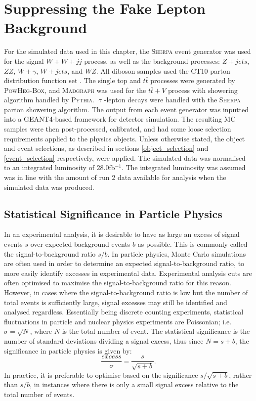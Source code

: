 \chapter{Suppressing the Fake Lepton Background}
For the simulated data used in this chapter, the \textsc{Sherpa} event generator was used for the signal $W+W+jj$ process, as well as the background processes: $Z+jets$, $ZZ$, $W+\gamma$, $W+jets$, and $WZ$. All diboson samples used the CT10 parton distribution function set \cite{CT10}. The single top and $t\bar{t}$ processes were generated by \textsc{PowHeg-Box}, and \textsc{Madgraph} was used for the $t\bar{t}+V$ process with showering algorithm handled by \textsc{Pythia}. $\uptau$-lepton decays were handled with the \textsc{Sherpa} parton showering algorithm. The output from each event generator was inputted into a GEANT4-based framework for detector simulation. The resulting MC samples were then post-processed, calibrated, and had some loose selection requirements applied to the physics objects. Unless otherwise stated, the object and event selections, as described in sections \ref{object_selection} and \ref{event_selection} respectively, were applied. The simulated data was normalised to an integrated luminosity of $28.0$fb$^{-1}$. The integrated luminosity was assumed was in line with the amount of run 2 data available for analysis when the simulated data was produced.
\section{Statistical Significance in Particle Physics}
In an experimental analysis, it is desirable to have as large an excess of signal events $s$ over expected background events $b$ as possible. This is commonly called the signal-to-background ratio $s/b$. In particle physics, Monte Carlo simulations are often used in order to determine an expected signal-to-background ratio, to more easily identify excesses in experimental data. Experimental analysis cuts are often optimised to maximise the signal-to-background ratio for this reason. However, in cases where the signal-to-background ratio is low but the number of total events is sufficiently large, signal excesses may still be identified and analysed regardless. Essentially being discrete counting experiments, statistical fluctuations in particle and nuclear physics experiments are Poissonian; i.e. $\sigma = \sqrt{N}$, where $N$ is the total number of event. The statistical significance is the number of standard deviations dividing a signal excess, thus since $N= s+b$, the significance in particle physics is given by:
$$ \frac{excess}{\sigma} = \frac{s}{\sqrt{s+b}}.$$ 
In practice, it is preferable to optimise based on the significance $s/\sqrt{s+b}$, rather than $s/b$, in instances where there is only a small signal excess relative to the total number of events.
